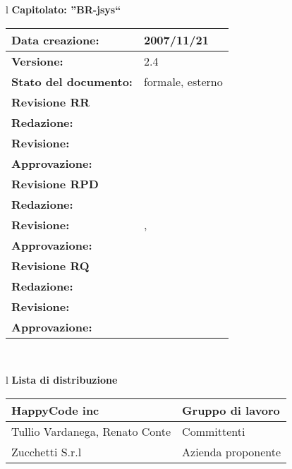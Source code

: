 

\newcommand{\lv}{ 2.4 } %
\newcommand{\dt}{ Piano Di Progetto }%
\newcommand{\Glossario}{ Glossario.1.8.pdf }


\begin{center}
\thispagestyle{plain}
\begin{table}[htbp]

\large{
\begin{tabular}{l}
\Large{\textbf{\textsf{Capitolato: ''BR-jsys``}}} \\
\begin{tabular}{|p{6cm}|p{6cm}|} \hline
\textbf{Data creazione:} & 2007/11/21 \\ \hline
\textbf{Versione:} & \lv \\ \hline
\textbf{Stato del documento:} & formale, esterno \\ \hline
\textbf{Revisione RR} &  \\ \hline
\textbf{Redazione:} & \ET \\ \hline
\textbf{Revisione:} & \MT \\ \hline
\textbf{Approvazione:} & \ET \\ \hline
\textbf{Revisione RPD} &    \\ \hline
\textbf{Redazione:} & \MM \\ \hline
\textbf{Revisione:} & \ET , \FC \\ \hline
\textbf{Approvazione:}  & \MM \\  \hline
\textbf{Revisione RQ} &    \\ \hline
\textbf{Redazione:} & \ET \\ \hline
\textbf{Revisione:} & \LA \\ \hline
\textbf{Approvazione:}  & \MT \\  \hline
\end{tabular} \\
\end{tabular}
}
\end{table}

\begin{table}[hbtp]
\large{
\begin{tabular}{l}
\Large{\textbf{\textsf{Lista di distribuzione}}} \\
\begin{tabular}{|p{6cm}|p{6cm}|} \hline
{HappyCode inc}& Gruppo di lavoro\\ \hline
{Tullio Vardanega, Renato Conte}& Committenti \\ \hline 
{Zucchetti S.r.l}& Azienda proponente\\ \hline
\end{tabular} \\
\end{tabular}
}
\end{table}
\begin{table}[hbtp]


\end{table}
\end{center}
